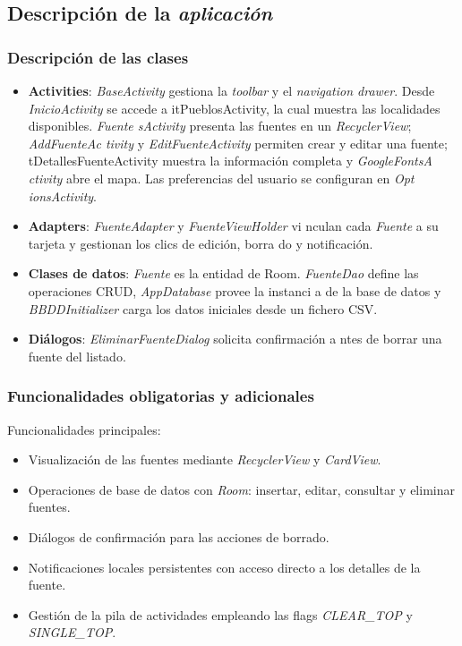 \documentclass[11pt,a4paper]{article}
\begin{document}
\subsection{Descripción de la \textit{aplicación}}

\subsubsection{Descripción de las clases}

\begin{itemize}
    \item \textbf{Activities}: \textit{BaseActivity} gestiona la \textit{toolbar}
    y el \textit{navigation drawer}. Desde \textit{InicioActivity} se accede a \text
    it{PueblosActivity}, la cual muestra las localidades disponibles. \textit{Fuente
    sActivity} presenta las fuentes en un \textit{RecyclerView}; \textit{AddFuenteAc
    tivity} y \textit{EditFuenteActivity} permiten crear y editar una fuente; \texti
    t{DetallesFuenteActivity} muestra la información completa y \textit{GoogleFontsA
    ctivity} abre el mapa. Las preferencias del usuario se configuran en \textit{Opt
    ionsActivity}.
    \item \textbf{Adapters}: \textit{FuenteAdapter} y \textit{FuenteViewHolder} vi
    nculan cada \textit{Fuente} a su tarjeta y gestionan los clics de edición, borra
    do y notificación.
    \item \textbf{Clases de datos}: \textit{Fuente} es la entidad de Room. \textit
    {FuenteDao} define las operaciones CRUD, \textit{AppDatabase} provee la instanci
    a de la base de datos y \textit{BBDDInitializer} carga los datos iniciales desde
     un fichero CSV.
    \item \textbf{Diálogos}: \textit{EliminarFuenteDialog} solicita confirmación a
    ntes de borrar una fuente del listado.
\end{itemize}



\subsubsection{Funcionalidades obligatorias y adicionales}

Funcionalidades principales:
\begin{itemize}
  \item Visualización de las fuentes mediante \textit{RecyclerView} y \textit{CardView}.
  \item Operaciones de base de datos con \textit{Room}: insertar, editar, consultar y eliminar fuentes.
  \item Diálogos de confirmación para las acciones de borrado.
  \item Notificaciones locales persistentes con acceso directo a los detalles de la fuente.
  \item Gestión de la pila de actividades empleando las flags \textit{CLEAR\_TOP} y \textit{SINGLE\_TOP}.
\end{itemize}
\end{document}
